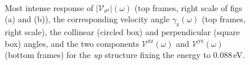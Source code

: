 \documentclass[prb,11pt,tightenlines,twocolumn,aps]{revtex4-1}
\begin{document}
\begin{figure}[b]
    \centering
    \\

    \caption{\color{red} Most intense response of
    $|\mathcal{V}_{\sigma^{\mathrm{z}}}|(\omega)$ (top frames, right scale of
    figs (a) and (b)), the corresponding velocity angle
    $\gamma_{\mathrm{z}}(\omega)$ (top frames, right scale), the collinear
    (circled box) and perpendicular (square box) angles, and the two components
    $\mathcal{V}^{\mathrm{xz}}(\omega)$ and $\mathcal{V}^{\mathrm{yz}}(\omega)$
    (bottom frames) for the \emph{up} structure fixing the energy to 0.088\,eV.
    }
    \label{fig:up-vaz-rag}
\end{figure}
\end{document}
